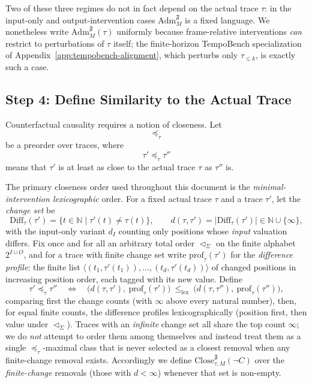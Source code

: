 \documentclass[11pt]{article}
\theoremstyle{remark}
\newcommand{\Close}{\mathrm{Close}}
\newcommand{\Nat}{\mathbb{N}}
\newcommand{\Frame}{\mathfrak{F}}
\newcommand{\Adm}{\mathrm{Adm}}
\begin{document}
Two of these three regimes do not in fact depend on the actual trace \(\tau\):
in the input-only and output-intervention cases \(\Adm_M^{\Frame}\) is a fixed
language. We nonetheless write \(\Adm_M^{\Frame}(\tau)\) uniformly because
frame-relative interventions \emph{can} restrict to perturbations of \(\tau\)
itself; the finite-horizon TempoBench specialization of
Appendix~\ref{app:tempobench-alignment}, which perturbs only \(\tau_{\le k}\),
is exactly such a case.

\subsection{Step 4: Define Similarity to the Actual Trace}
\label{step:similarity}

Counterfactual causality requires a notion of closeness. Let
\[
  \preceq_\tau
\]
be a preorder over traces, where
\[
  \tau' \preceq_\tau \tau''
\]
means that \(\tau'\) is at least as close to the actual trace \(\tau\) as
\(\tau''\) is.

The primary closeness order used throughout this document is the
\emph{minimal-intervention lexicographic} order. For a fixed actual trace
\(\tau\) and a trace \(\tau'\), let the \emph{change set} be
\[
  \mathrm{Diff}_\tau(\tau')=\{t\in\Nat\mid \tau'(t)\neq\tau(t)\},
  \qquad
  d(\tau,\tau')=|\mathrm{Diff}_\tau(\tau')|\in\Nat\cup\{\infty\},
\]
with the input-only variant \(d_I\) counting only positions whose \emph{input}
valuation differs. Fix once and for all an arbitrary total order \(\lhd_\Sigma\)
on the finite alphabet \(2^{I\cup O}\), and for a trace with finite change set
write \(\mathrm{prof}_\tau(\tau')\) for the \emph{difference profile}: the finite
list \(\langle(t_1,\tau'(t_1)),\ldots,(t_d,\tau'(t_d))\rangle\) of changed
positions in increasing position order, each tagged with its new value. Define
\[
  \tau'\preceq_\tau\tau''
  \quad\Longleftrightarrow\quad
  \bigl(d(\tau,\tau'),\ \mathrm{prof}_\tau(\tau')\bigr)
  \ \le_{\mathrm{lex}}\
  \bigl(d(\tau,\tau''),\ \mathrm{prof}_\tau(\tau'')\bigr),
\]
comparing first the change counts (with \(\infty\) above every natural number),
then, for equal finite counts, the difference profiles lexicographically
(position first, then value under \(\lhd_\Sigma\)). Traces with an \emph{infinite}
change set all share the top count \(\infty\); we do \emph{not} attempt to order
them among themselves and instead treat them as a single \(\preceq_\tau\)-maximal
class that is never selected as a closest removal when any finite-change removal
exists. Accordingly we define \(\Close_{\tau,M}^{\Frame}(\neg C)\) over the
\emph{finite-change} removals (those with \(d<\infty\)) whenever that set is
non-empty.
\end{document}
